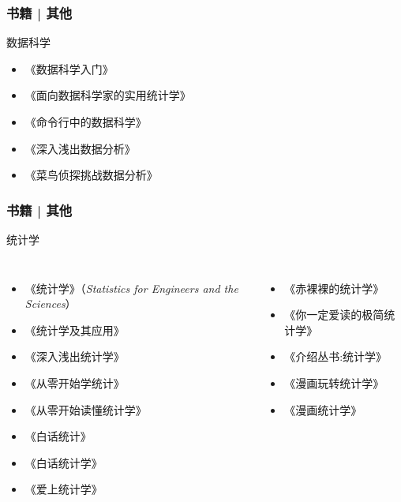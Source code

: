 \begin{frame}
  \frametitle{书籍 | 其他}
    \begin{block}{数据科学}
      \begin{itemize}
        \item 《数据科学入门》
        \item 《面向数据科学家的实用统计学》
        \item 《命令行中的数据科学》
        \item 《深入浅出数据分析》
        \item 《菜鸟侦探挑战数据分析》
      \end{itemize}
  \end{block}
\end{frame}

\begin{frame}
  \frametitle{书籍 | 其他}
    \begin{block}{统计学}
    \begin{columns}
    \begin{itemize}
      \item 《统计学》（\textit{Statistics for Engineers and the Sciences}）
      \item 《统计学及其应用》
      \item 《深入浅出统计学》
      \item 《从零开始学统计》
      \item 《从零开始读懂统计学》
      \item 《白话统计》
      \item 《白话统计学》
      \item 《爱上统计学》
    \end{itemize}
    \begin{itemize}
      \item \alert{《赤裸裸的统计学》}
      \item 《你一定爱读的极简统计学》
      \item 《介绍丛书:统计学》
      \item 《漫画玩转统计学》
      \item 《漫画统计学》
    \end{itemize}
  \end{columns}
  \end{block}
\end{frame}

